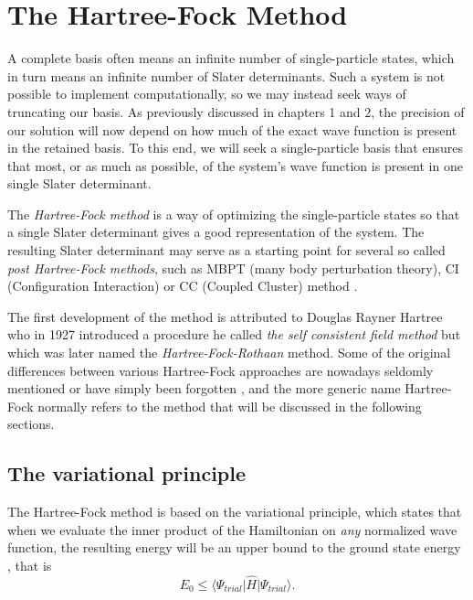 \section{The Hartree-Fock Method}

A complete basis often means an infinite number of single-particle
states, which in turn means an infinite number of Slater
determinants. Such a system is not possible to implement
computationally, so we may instead seek ways of truncating our
basis. As previously discussed in chapters 1 and 2, the precision of
our solution will now depend on how much of the exact wave function is
present in the retained basis. To this end, we will seek a
single-particle basis that ensures that most, or as much as possible,  of the system's wave
function is present in one single Slater determinant.

The \emph{Hartree-Fock method} is a way of optimizing the
single-particle states so that a single Slater determinant gives a
good representation of the system. The resulting Slater determinant
may serve as a starting point for several so called \emph{post Hartree-Fock methods}, 
such as MBPT (many body perturbation theory),
CI (Configuration Interaction) or CC (Coupled Cluster)
method \cite{ShavittBartlett2009}.

The first development of the method is attributed to Douglas Rayner
Hartree who in 1927 introduced a procedure he called 
\emph{the self  consistent field method} \cite{Thijssen} but which was later named
the \emph{Hartree-Fock-Rothaan} method. Some of the original differences between various Hartree-Fock approaches 
are nowadays seldomly mentioned or have simply been forgotten \cite{ShavittBartlett2009},
and the more generic name Hartree-Fock normally refers to the method that will be discussed in
the following sections.

\subsection{The variational principle}

The Hartree-Fock method is based on the variational principle, which
states that when we evaluate the inner product of the Hamiltonian on
\emph{any} normalized wave function, the resulting energy will be an
upper bound to the ground state energy \cite{Griffiths2005},
that is
\begin{equation}
E_0 \leq \langle \Psi_{trial} \vert \hat{H} \vert \Psi_{trial} \rangle.
\label{eqn:variational}
\end{equation}

